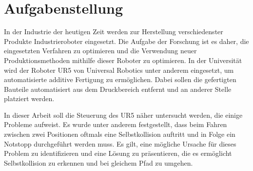 \chapter*{Aufgabenstellung}

In der Industrie der heutigen Zeit werden zur Herstellung verschiedenster Produkte Industrieroboter eingesetzt.
Die Aufgabe der Forschung ist es daher, die eingesetzten Verfahren zu optimieren und die Verwendung neuer Produktionsmethoden mithilfe dieser Roboter zu optimieren.
In der Universität wird der Roboter UR5 von Universal Robotics unter anderem eingesetzt, um automatisierte additive Fertigung zu ermöglichen.
Dabei sollen die gefertigten Bauteile automatisiert aus dem Druckbereich entfernt und an anderer Stelle platziert werden.

In dieser Arbeit soll die Steuerung des UR5 näher untersucht werden, die einige Probleme aufweist.
Es wurde unter anderem festgestellt, dass beim Fahren zwischen zwei Positionen oftmals eine Selbstkollision auftritt und in Folge ein Notstopp durchgeführt werden muss.
Es gilt, eine mögliche Ursache für dieses Problem zu identifizieren und eine Lösung zu präsentieren, die es ermöglicht Selbstkollision zu erkennen und bei gleichem Pfad zu umgehen.